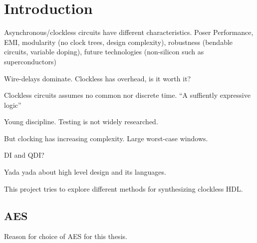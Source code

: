 \section{Introduction}

Asynchronous/clockless circuits have different characteristics. Poser
Performance, EMI, modularity (no clock trees, design complexity),
robustness (bendable circuits, variable doping), future technologies
(non-silicon such as superconductors)

Wire-delays dominate. Clockless has overhead, is it worth it?

Clockless circuits assumes no common nor discrete time. ``A suffiently
expressive logic''

Young discipline. Testing is not widely researched.

But clocking has increasing complexity. Large worst-case windows.

DI and QDI?

Yada yada about high level design and its languages.

This project tries to explore different methods for synthesizing
clockless HDL.

\subsection{AES}

Reason for choice of AES for this thesis.




